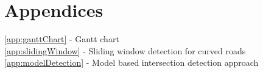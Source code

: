 \documentclass[]{aiaa-tc}%
\begin{document}
%
%
\newpage
\section*{Appendices}

\ref{app:ganttChart} - Gantt chart \\

\ref{app:slidingWindow} - Sliding window detection for curved roads \\

\ref{app:modelDetection} - Model based intersection detection approach \\




%

\appendix
 
 
 
\end{document}
